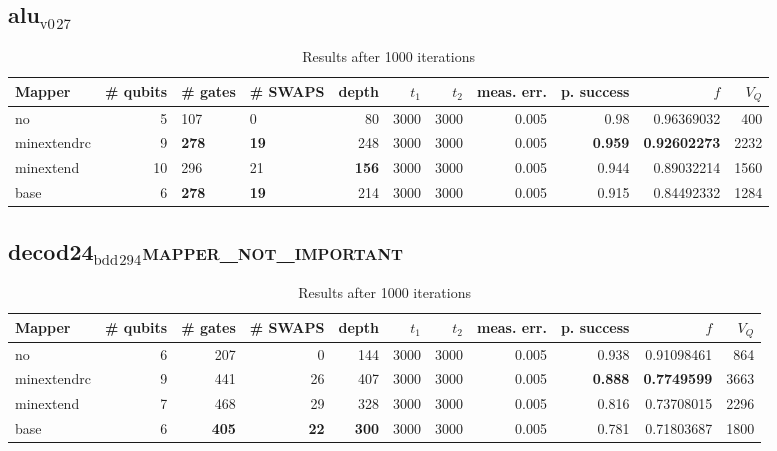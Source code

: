 \documentclass[11pt]{article}
\begin{document}
\subsection{alu\(_{\text{v0}}\)\(_{\text{27}}\)}
\label{sec:orgf87efb4}
\begin{table}[H]
\caption{\label{tab:orgfc928a8}
Results after 1000 iterations}
\centering
\small
\begin{tabular}{lrllrrrrrrr}
\hline
Mapper & \# qubits & \# gates & \# SWAPS & depth & \(t_1\) & \(t_2\) & meas. err. & p. success & \(f\) & \(V_Q\)\\
\hline
no & 5 & 107 & 0 & 80 & 3000 & 3000 & 0.005 & 0.98 & 0.96369032 & 400\\
\hline
minextendrc & 9 & \textbf{278} & \textbf{19} & 248 & 3000 & 3000 & 0.005 & \textbf{0.959} & \textbf{0.92602273} & 2232\\
minextend & 10 & 296 & 21 & \textbf{156} & 3000 & 3000 & 0.005 & 0.944 & 0.89032214 & 1560\\
base & 6 & \textbf{278} & \textbf{19} & 214 & 3000 & 3000 & 0.005 & 0.915 & 0.84492332 & 1284\\
\hline
\end{tabular}
\end{table}
\subsection{decod24\(_{\text{bdd}}\)\(_{\text{294}}\)\hfill{}\textsc{mapper\_not\_important}}
\label{sec:orgc1c22b4}
\begin{table}[H]
\caption{\label{tab:org0df357d}
Results after 1000 iterations}
\centering
\small
\begin{tabular}{lrrrrrrrrrr}
\hline
Mapper & \# qubits & \# gates & \# SWAPS & depth & \(t_1\) & \(t_2\) & meas. err. & p. success & \(f\) & \(V_Q\)\\
\hline
no & 6 & 207 & 0 & 144 & 3000 & 3000 & 0.005 & 0.938 & 0.91098461 & 864\\
\hline
minextendrc & 9 & 441 & 26 & 407 & 3000 & 3000 & 0.005 & \textbf{0.888} & \textbf{0.7749599} & 3663\\
minextend & 7 & 468 & 29 & 328 & 3000 & 3000 & 0.005 & 0.816 & 0.73708015 & 2296\\
base & 6 & \textbf{405} & \textbf{22} & \textbf{300} & 3000 & 3000 & 0.005 & 0.781 & 0.71803687 & 1800\\
\hline
\end{tabular}
\end{table}
\end{document}
